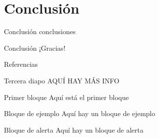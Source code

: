 \section{Conclusión}

\begin{frame}{Conclusión}
    conclusiones
\end{frame}


\begin{frame}{Conclusión}
    \centering
    \Huge ¡Gracias!
\end{frame}

\begin{frame}{Referencias}

\end{frame}

\begin{frame}{Tercera diapo}
    AQUÍ HAY MÁS INFO
     \begin{block}{Primer bloque}
        Aquí está el primer bloque
    \end{block}
    \begin{exampleblock}{Bloque de ejemplo}
        Aquí hay un bloque de ejemplo
    \end{exampleblock}
    \begin{alertblock}{Bloque de alerta}
        Aquí hay un bloque de alerta
    \end{alertblock}
\end{frame}
